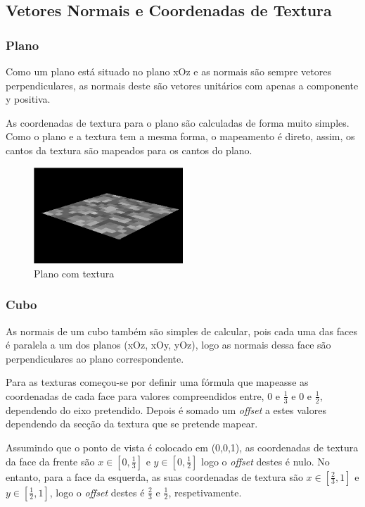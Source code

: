 \documentclass[a4paper]{article}
\begin{document}
\subsection{Vetores Normais e Coordenadas de Textura}

\subsubsection{Plano}
Como um plano está situado no plano xOz e as normais são sempre vetores
perpendiculares, as normais deste são vetores unitários com apenas a componente
y positiva.

As coordenadas de textura para o plano são calculadas de forma
muito simples. Como o plano e a textura tem a mesma forma, o mapeamento é
direto, assim, os cantos da textura são mapeados para os cantos do plano.

\begin{figure}[H]
    \centering
    \includegraphics[width=0.5\textwidth]{plane.png}
    \caption{Plano com textura}
\end{figure}

\subsubsection{Cubo}
As normais de um cubo também são simples de calcular, pois cada uma das faces é
paralela a um dos planos (xOz, xOy, yOz), logo as normais dessa face são
perpendiculares ao plano correspondente.

Para as texturas começou-se por definir uma fórmula que mapeasse as coordenadas
de cada face para valores compreendidos entre, 0 e $\frac{1}{3}$ e 0 e
$\frac{1}{2}$, dependendo do eixo pretendido. Depois é somado um
\textit{offset} a estes valores dependendo da secção da textura que se pretende
mapear.

Assumindo que o ponto de vista é colocado em (0,0,1), as coordenadas de textura
da face da frente são $x \in [0,\frac{1}{3}]$ e $y \in [0,\frac{1}{2}]$ logo o
\textit{offset} destes é nulo. No entanto, para a face da esquerda, as suas
coordenadas de textura são $x \in [\frac{2}{3},1]$ e $y \in [\frac{1}{2},1]$,
logo o \textit{offset} destes é $\frac{2}{3}$ e $\frac{1}{2}$, respetivamente.
\end{document}
